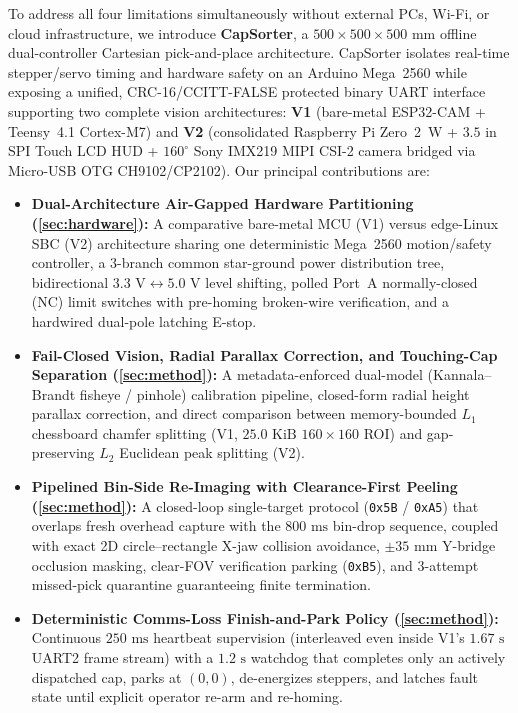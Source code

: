 \documentclass[10pt,twocolumn,letterpaper]{article}
\begin{document}
To address all four limitations simultaneously without external PCs, Wi-Fi, or cloud infrastructure, we introduce \textbf{CapSorter}, a $500\times 500\times 500\text{ mm}$ offline dual-controller Cartesian pick-and-place architecture. CapSorter isolates real-time stepper/servo timing and hardware safety on an Arduino Mega~2560 while exposing a unified, CRC-16/CCITT-FALSE protected binary UART interface supporting two complete vision architectures: \textbf{V1} (bare-metal ESP32-CAM + Teensy~4.1 Cortex-M7) and \textbf{V2} (consolidated Raspberry Pi Zero~2~W + $3.5\text{ in}$ SPI Touch LCD HUD + $160^\circ$ Sony IMX219 MIPI CSI-2 camera bridged via Micro-USB OTG CH9102/CP2102). Our principal contributions are:
\begin{itemize}
  \item \textbf{Dual-Architecture Air-Gapped Hardware Partitioning (\cref{sec:hardware}):} A comparative bare-metal MCU (V1) versus edge-Linux SBC (V2) architecture sharing one deterministic Mega~2560 motion/safety controller, a 3-branch common star-ground power distribution tree, bidirectional $3.3\text{ V}\leftrightarrow 5.0\text{ V}$ level shifting, polled Port~A normally-closed (NC) limit switches with pre-homing broken-wire verification, and a hardwired dual-pole latching E-stop.
  \item \textbf{Fail-Closed Vision, Radial Parallax Correction, and Touching-Cap Separation (\cref{sec:method}):} A metadata-enforced dual-model (Kannala--Brandt fisheye / pinhole) calibration pipeline, closed-form radial height parallax correction, and direct comparison between memory-bounded $L_1$ chessboard chamfer splitting (V1, $25.0\text{ KiB}$ $160\times 160$ ROI) and gap-preserving $L_2$ Euclidean peak splitting (V2).
  \item \textbf{Pipelined Bin-Side Re-Imaging with Clearance-First Peeling (\cref{sec:method}):} A closed-loop single-target protocol (\texttt{0x5B} / \texttt{0xA5}) that overlaps fresh overhead capture with the $800\text{ ms}$ bin-drop sequence, coupled with exact 2D circle--rectangle X-jaw collision avoidance, $\pm 35\text{ mm}$ Y-bridge occlusion masking, clear-FOV verification parking (\texttt{0xB5}), and 3-attempt missed-pick quarantine guaranteeing finite termination.
  \item \textbf{Deterministic Comms-Loss Finish-and-Park Policy (\cref{sec:method}):} Continuous $250\text{ ms}$ heartbeat supervision (interleaved even inside V1's $1.67\text{ s}$ UART2 frame stream) with a $1.2\text{ s}$ watchdog that completes only an actively dispatched cap, parks at $(0,0)$, de-energizes steppers, and latches fault state until explicit operator re-arm and re-homing.

\end{itemize}
\end{document}
